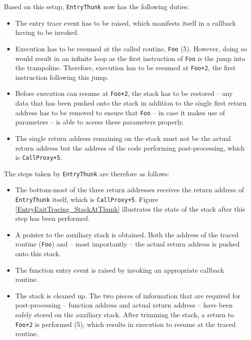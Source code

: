 Based on this setup, \verb|EntryThunk| now has the following duties:
\begin{itemize}
	\item The entry trace event has to be raised, which manifests itself in
		a callback having to be invoked.
	\item Execution has to be resumed at the called routine, \verb|Foo| (5). However,
		doing so would result in an infinite loop as the first instruction of
		\verb|Foo| is the jump into the trampoline. Therefore, execution has to
		be resumed at \verb|Foo+2|, the first instruction following this jump.
	\item Before execution can resume at \verb|Foo+2|, the stack has to be restored --
		any data that has been pushed onto the stack in addition to the single first
		return address has to be removed to ensure that \verb|Foo| -- in case it makes
		use of parameters -- is able to access these parameters properly.
	\item The single return address remaining on the stack must not be the actual
		return address but the address of the code performing post-processing, which
		is \verb|CallProxy+5|.
\end{itemize}

The steps taken by \verb|EntryThunk| are therefore as follows:

\begin{itemize}
	\item The bottom-most of the three return addresses receives the return address
		of \verb|EntryThunk| itself, which is \verb|CallProxy+5|. Figure 
		\ref{EntryExitTracing_StackAtThunk} illustrates
		the state of the stack after this step has been performed.
	\item A pointer to the auxiliary stack is obtained. Both the address of the traced
		routine (\verb|Foo|) and -- most importantly -- the actual return address is
		pushed onto this stack.
	\item The function entry event is raised by invoking an appropriate callback
		routine.
	\item The stack is cleaned up. The two pieces of information that are required
		for post-processing -- function address and actual return address -- have been
		safely stored on the auxiliary stack. After trimming the stack, a return to 
		\verb|Foo+2| is performed (5), which results in execution to resume at the traced
		routine.
\end{itemize}

